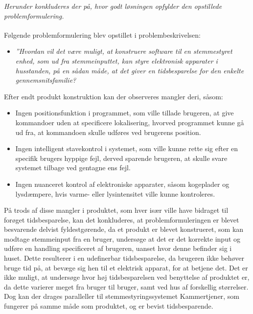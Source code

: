 \textit{Herunder konkluderes der på, hvor godt løsningen opfylder den opstillede problemformulering.}\\\\

Følgende problemformulering blev opstillet i problembeskrivelsen:

\begin{itemize}
    \item \textit{”Hvordan vil det være muligt, at konstruere software til en stemmestyret enhed, som ud fra stemmeinputtet, kan styre elektronisk apparater i husstanden, på en sådan måde, at det giver en tidsbesparelse for den enkelte gennemsnitsfamilie?}
\end{itemize} 

Efter endt produkt konstruktion kan der observeres mangler deri, såsom:
\begin{itemize}
    \item Ingen positionsfunktion i programmet, som ville tillade brugeren, at give kommandoer uden at specificere lokalisering, hvorved programmet kunne gå ud fra, at kommandoen skulle udføres ved brugerens position.
    \item Ingen intelligent stavekontrol i systemet, som ville kunne rette sig efter en specifik brugers hyppige fejl, derved sparende brugeren, at skulle svare systemet tilbage ved gentagne ens fejl.
    \item Ingen nuanceret kontrol af elektroniske apparater, såsom kogeplader og lysdæmpere, hvis varme- eller lysintensitet ville kunne kontroleres.
\end{itemize} 

På trods af disse mangler i produktet, som hver især ville have bidraget til forøget tidsbesparelse, kan det konkluderes, at problemformuleringen er blevet besvarende delvist fyldestgørende, da et produkt er blevet konstrueret, som kan modtage stemmeinput fra en bruger, undersøge at det er det korrekte input og udføre en handling specificeret af brugeren, uanset hvor denne befinder sig i huset. Dette resulterer i en udefinerbar tidsbesparelse, da brugeren ikke behøver bruge tid på, at bevæge sig hen til et elektrisk apparat, for at betjene det. Det er ikke muligt, at undersøge hvor høj tidsbesparelsen ved benyttelse af produktet er, da dette varierer meget fra bruger til bruger, samt ved hus af forskellig størrelser. Dog kan der drages paralleller til stemmestyringssystemet Kammertjener\cite{Kammertjener}, som fungerer på samme måde som produktet, og er bevist tidsbesparende.